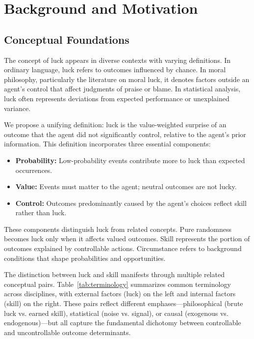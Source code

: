 \section{Background and Motivation}
\label{sec:background}

\subsection{Conceptual Foundations}

The concept of luck appears in diverse contexts with varying definitions.
In ordinary language, luck refers to outcomes influenced by chance. In
moral philosophy, particularly the literature on moral luck, it denotes
factors outside an agent's control that affect judgments of praise or
blame. In statistical analysis, luck often represents deviations from
expected performance or unexplained variance.

We propose a unifying definition: luck is the value-weighted surprise of
an outcome that the agent did not significantly control, relative to the
agent's prior information. This definition incorporates three essential components:

\begin{itemize}
  \item \textbf{Probability:} Low-probability events contribute more to
    luck than expected occurrences.

  \item \textbf{Value:} Events must matter to the agent; neutral outcomes
    are not lucky.

  \item \textbf{Control:} Outcomes predominantly caused by the agent's
    choices reflect skill rather than luck.
\end{itemize}

These components distinguish luck from related concepts. Pure randomness
becomes luck only when it affects valued outcomes. Skill represents the
portion of outcomes explained by controllable actions. Circumstance refers
to background conditions that shape probabilities and opportunities.

The distinction between luck and skill manifests through multiple related
conceptual pairs. Table~\ref{tab:terminology} summarizes common
terminology across disciplines, with external factors (luck) on the left
and internal factors (skill) on the right. These pairs reflect different
emphases—philosophical (brute luck vs. earned skill), statistical (noise
vs. signal), or causal (exogenous vs. endogenous)—but all capture the
fundamental dichotomy between controllable and uncontrollable outcome
determinants.

